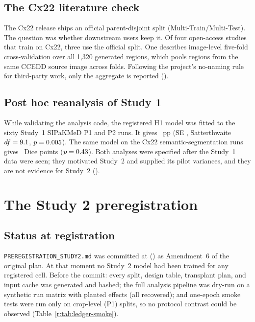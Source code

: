 \section{The Cx22 literature check}
\label{r:sec:cx22-lit}

The Cx22 release ships an official parent-disjoint split (Multi-Train/Multi-Test). The question was whether downstream
users keep it. Of four open-access studies that train on Cx22, three use the official split. One describes image-level
five-fold cross-validation over all 1,320 generated regions, which pools regions from the same CCEDD source image across
folds. Following the project's no-naming rule for third-party work, only the aggregate is reported
().

\section{Post hoc reanalysis of Study 1}

While validating the analysis code, the registered H1 model was fitted to the sixty Study~1 SIPaKMeD P1 and P2 runs. It
gives \RecPostSipEst~pp (SE \RecPostSipSE, Satterthwaite $df=9.1$, $p=0.005$). The same model on the
Cx22 semantic-segmentation runs gives \RecPostCxEst\ Dice points ($p=0.43$). Both analyses were specified after
the Study~1 data were seen; they motivated Study~2 and supplied its pilot variances, and they are not evidence for
Study~2 ().

\chapter{The Study 2 preregistration}
\label{r:ch:prereg}



\section{Status at registration}

\texttt{PREREGISTRATION\_STUDY2.md} was committed at \texttt{\RegistrationCommit} (\RegistrationTime) as Amendment~6
of the original plan. At that moment no Study~2 model had been trained for any registered cell. Before the commit:
every split, design table, transplant plan, and input cache was generated and hashed; the full analysis pipeline was
dry-run on a synthetic run matrix with planted effects (all recovered); and one-epoch smoke tests were run only on
crop-level (P1) splits, so no protocol contrast could be observed (Table~\ref{r:tab:ledger-smoke}).

